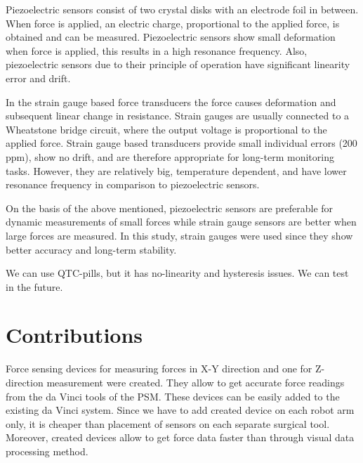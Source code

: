 Piezoelectric sensors consist of two crystal disks with an electrode foil in between. When force is applied, an electric charge, proportional to the applied force, is obtained and can be measured. Piezoelectric sensors show small deformation when force is applied, this results in a high resonance frequency. Also, piezoelectric sensors due to their principle of operation have significant linearity error and drift. \cite{SGandP2}

In the strain gauge based force transducers the force causes deformation and subsequent linear change in resistance. Strain gauges are usually connected to a Wheatstone bridge circuit, where the output voltage is proportional to the applied force. Strain gauge based transducers provide small individual errors (200 ppm), show no drift, and are therefore appropriate for long-term monitoring tasks. However, they are relatively big, temperature dependent, and have lower resonance frequency in comparison to piezoelectric sensors. \cite{SGandP1,SGandP2}

On the basis of the above mentioned, piezoelectric sensors are preferable for dynamic measurements of small forces while strain gauge sensors are better when large forces are measured. In this study, strain gauges were used since they show better accuracy and long-term stability. \cite{SGandP1,SGandP2}

We can use QTC-pills, but it has no-linearity and hysteresis issues. We can test in the future.


\section{Contributions}
\label{sec:MyAppr}
Force sensing devices for measuring forces in X-Y direction and one for Z-direction measurement were created. They allow to get accurate force readings from the da Vinci tools of the PSM.  These devices can be easily added to the existing da Vinci system. Since we have to add created device on each robot arm only, it is cheaper than placement of sensors on each separate surgical tool.  Moreover, created devices allow to get force data faster than through visual data processing method. 
